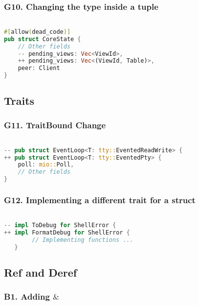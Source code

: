 \documentclass{article}
\begin{document}
\subsubsection{G10. Changing the type inside a tuple}

\begin{lstlisting}[language=Rust, style=colouredRust, label={l3}]

#[allow(dead_code)]
pub struct CoreState {
    // Other fields
    -- pending_views: Vec<ViewId>,
    ++ pending_views: Vec<(ViewId, Table)>,
    peer: Client
}

\end{lstlisting}

\subsection{Traits}
\subsubsection{G11. TraitBound Change}

\begin{lstlisting}[language=Rust, style=colouredRust, label={l3}]

-- pub struct EventLoop<T: tty::EventedReadWrite> {
++ pub struct EventLoop<T: tty::EventedPty> {
    poll: mio::Poll,
    // Other fields
}

\end{lstlisting}

\subsubsection{G12. Implementing a different trait for a struct}

\begin{lstlisting}[language=Rust, style=colouredRust, label={l3}]

-- impl ToDebug for ShellError {
++ impl FormatDebug for ShellError {
        // Implementing functions ...
   }

\end{lstlisting}

\subsection{Ref and Deref}
\subsubsection{B1. Adding $\&$}
\end{document}
